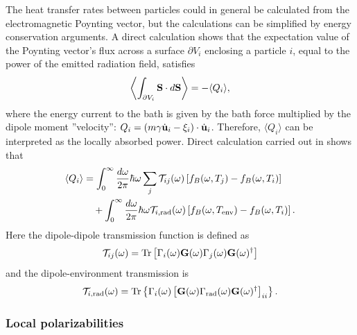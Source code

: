The heat transfer rates between particles could in general be calculated from the electromagnetic Poynting vector, but the calculations can be simplified by energy conservation arguments. A direct calculation shows that the expectation value of the Poynting vector's flux across a surface $\partial V_i$ enclosing a particle $i$, equal to the power of the emitted radiation field, satisfies 
\begin{equation}
 \left\langle \int_{\partial V_i} \mathbf{S} \cdot d\mathbf{S} \right\rangle = - \langle Q_i \rangle,
\end{equation}
where the energy current to the bath is given by the bath force multiplied by the dipole moment ''velocity'': $Q_i = (m\gamma \dot{\mathbf{u}}_i-\xi_i)\cdot \dot{\mathbf{u}}_i$. Therefore, $\langle Q_i\rangle$ can be interpreted as the locally absorbed power. Direct calculation carried out in  shows that 
\begin{alignat}{2}
 \langle Q_i \rangle &= \int_0^{\infty}\frac{d\omega}{2\pi} \hbar\omega \sum_{j} \mathcal{T}_{ij}(\omega) \left[f_B(\omega,T_j)-f_B(\omega,T_i ) \right] \notag \\
  & \quad + \int_0^{\infty} \frac{d\omega}{2\pi} \hbar \omega \mathcal{T}_{i,\textrm{rad}}(\omega)\left[ f_B(\omega,T_{\textrm{env}})-f_B(\omega,T_i)\right].
\end{alignat}
Here the dipole-dipole transmission function is defined as
\begin{equation}
 \mathcal{T}_{ij}(\omega) = \textrm{Tr} \left[\Gamma_i(\omega) \mathbf{G}(\omega) \Gamma_j(\omega) \mathbf{G}(\omega)^{\dagger} \right]
\end{equation}
and the dipole-environment transmission is 
\begin{equation}
 \mathcal{T}_{i,\textrm{rad}}(\omega) =  \textrm{Tr} \left\{ \Gamma_i(\omega) \left[ \mathbf{G}(\omega) \Gamma_{\textrm{rad}}(\omega) \mathbf{G}(\omega)^{\dagger} \right]_{ii} \right\}. \label{eq:th_Tirad}
\end{equation}

\subsubsection{Local polarizabilities}

